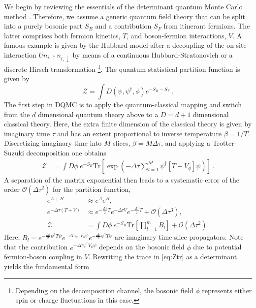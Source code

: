 \documentclass[submission, Phys]{SciPost}
\begin{document}
We begin by reviewing the essentials of the determinant quantum Monte Carlo method \cite{Blankenbecler1981, Loh2005, Scalapino1993, Santos2003, Assaad2002a}. Therefore, we assume a generic quantum field theory that can be split into a purely bosonic part $S_B$ and a contribution $S_F$ from itinerant fermions. The latter comprises both fermion kinetics, $T$, and boson-fermion interactions, $V$. A famous example is given by the Hubbard model after a decoupling of the on-site
interaction $U n_{i, \uparrow} n_{i, \downarrow}$ by means of a continuous Hubbard-Stratonovich or a discrete Hirsch transformation \cite{Hirsch1983}\footnote{Depending on the decomposition channel, the bosonic field $\phi$ represents either spin or charge fluctuations in this case.}. The quantum statistical partition function is given by
%
\begin{equation}
\mathcal{Z} = \int D\left( \psi, \psi^\dagger, \phi \right) e^{-S_B - S_F} \,.
\end{equation}
%
The first step in DQMC is to apply the quantum-classical mapping \cite{Sachdev2011} and switch from the $d$ dimensional quantum theory above to a $D = d + 1$ dimensional classical theory. Here, the extra finite dimension of the classical theory is given by imaginary time $\tau$ and has an extent proportional to inverse temperature $\beta = 1/T$. Discretizing imaginary time into $M$ slices, $\beta = M \Delta \tau$, and applying a Trotter-Suzuki decomposition \cite{Trotter1959, Suzuki1986} one obtains
%
\begin{align}
	\mathcal{Z} &= \int D\phi \ e^{-S_B} \mathrm{Tr}{\left[\exp{\left( -\Delta\tau \sum_{l=1}^M \psi^\dagger \left[T + V_\phi\right] \psi \right)}\right]} \label{eq:discretizedpi} \,.
\end{align}
%
A separation of the matrix exponential then leads to a systematic error of the order $\mathcal{O}\left(\Delta\tau^2\right)$ for the partition function,
\begin{align}
	e^{A + B} &\approx e^A e^B, \quad \nonumber\\
	e^{-\Delta\tau (T + V)} &\approx e^{- \frac{\Delta\tau}{2}T} e^{-\Delta\tau V} e^{- \frac{\Delta\tau}{2}T} + \mathcal{O}\left(\Delta\tau^3\right), \nonumber\\
	\mathcal{Z} &= \int D\phi \ e^{-S_B} \mathrm{Tr}{\left[ \prod_{l=1}^{m} B_l \right]} + \mathcal{O}\left(\Delta\tau^2\right). \label{eq:Ztr}
\end{align}
%
Here, $B_l = e^{- \frac{\Delta\tau}{2}\psi^\dagger T \psi} e^{-\Delta\tau \psi^\dagger V_\phi \psi} e^{- \frac{\Delta\tau}{2}\psi^\dagger T \psi}$ are imaginary time slice propagators. Note that the contribution $e^{-\Delta\tau \psi^\dagger V_\phi \psi}$ depends on the bosonic field $\phi$ due to potential fermion-boson coupling in $V$. Rewriting the trace in \eqref{eq:Ztr} as a determinant\cite{Assaad2002a} yields the fundamental form
\end{document}
